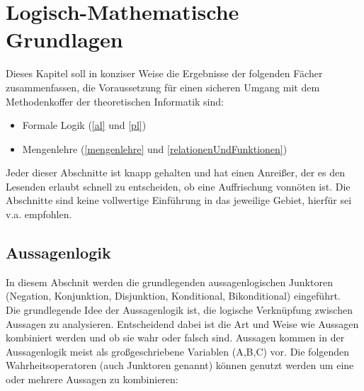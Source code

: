\chapter{Logisch-Mathematische Grundlagen}
Dieses Kapitel soll in konziser Weise die Ergebnisse der folgenden Fächer zusammenfassen,
die Voraussetzung für einen sicheren Umgang mit dem Methodenkoffer
der theoretischen Informatik sind:
\begin{itemize}
    \item Formale Logik (\autoref{al} und \autoref{pl})
    \item Mengenlehre (\autoref{mengenlehre} und \autoref{relationenUndFunktionen})
\end{itemize}
Jeder dieser Abschnitte ist knapp gehalten und hat einen Anreißer,
der es den Lesenden erlaubt schnell zu entscheiden,
ob eine Auffrischung vonnöten ist.
Die Abschnitte sind keine vollwertige Einführung in das jeweilige Gebiet,
hierfür sei v.a. \cite{link} empfohlen.

\section{Aussagenlogik}\label{al}
In diesem Abschnit werden die grundlegenden aussagenlogischen Junktoren
(Negation, Konjunktion, Disjunktion, Konditional, Bikonditional) eingeführt.\\


Die grundlegende Idee der Aussagenlogik ist,
die logische Verknüpfung zwischen Aussagen zu analysieren.
Entscheidend dabei ist die Art und Weise wie Aussagen kombiniert werden
und ob sie wahr oder falsch sind.
Aussagen kommen in der Aussagenlogik meist als großgeschriebene Variablen (A,B,C) vor.
Die folgenden Wahrheitsoperatoren (auch Junktoren genannt)
können genutzt werden um eine oder mehrere Aussagen zu kombinieren:

